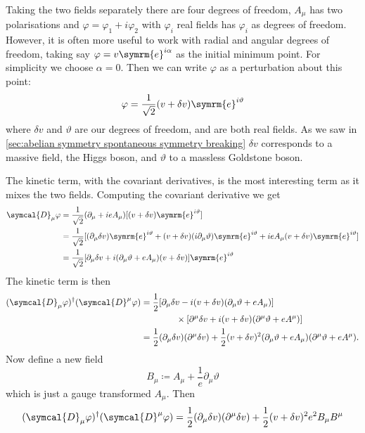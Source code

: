 \documentclass[fleqn]{NotesClass}
\newcommand{\e}{\symrm{e}}
\newcommand{\hermit}{\dagger}
\newcommand{\covariantDerivative}{\symcal{D}}
\begin{document}
    Taking the two fields separately there are four degrees of freedom, \(A_\mu\) has two polarisations and \(\varphi = \varphi_1 + i\varphi_2\) with \(\varphi_i\) real fields has \(\varphi_i\) as degrees of freedom.
    However, it is often more useful to work with radial and angular degrees of freedom, taking say \(\varphi = v\e^{i\alpha}\) as the initial minimum point.
    For simplicity we choose \(\alpha = 0\).
    Then we can write \(\varphi\) as a perturbation about this point:
    \begin{equation}
        \varphi = \frac{1}{\sqrt{2}}(v + \delta v)\e^{i\vartheta}
    \end{equation}
    where \(\delta v\) and \(\vartheta\) are our degrees of freedom, and are both real fields.
    As we saw in \cref{sec:abelian symmetry spontaneous symmetry breaking} \(\delta v\) corresponds to a massive field, the Higgs boson, and \(\vartheta\) to a massless Goldstone boson.
    
    The kinetic term, with the covariant derivatives, is the most interesting term as it mixes the two fields.
    Computing the covariant derivative we get
    \begin{align}
        \covariantDerivative_\mu \varphi &= \frac{1}{\sqrt{2}}(\partial_\mu + ieA_\mu) [(v + \delta v) \e^{i\vartheta}]\\
        &= \frac{1}{\sqrt{2}} [(\partial_\mu \delta v) \e^{i\vartheta} + (v + \delta v)(i\partial_\mu \vartheta)\e^{i\vartheta} + ieA_\mu (v + \delta v)\e^{i\vartheta}]\\
        &= \frac{1}{\sqrt{2}} [\partial_\mu \delta v + i(\partial_\mu \vartheta + eA_\mu)(v + \delta v)]\e^{i\vartheta}
    \end{align}
    The kinetic term is then
    \begin{align}
        (\covariantDerivative_\mu \varphi)^\hermit (\covariantDerivative^\mu \varphi) &= \frac{1}{2} [\partial_\mu \delta v - i(v + \delta v)(\partial_\mu \vartheta + eA_\mu)] \notag\\
        &\qquad \qquad \times [\partial^\mu \delta v + i(v + \delta v)(\partial^\mu \vartheta + eA^\mu)]\\
        &= \frac{1}{2}(\partial_\mu \delta v)(\partial^\mu \delta v) + \frac{1}{2}(v + \delta v)^2(\partial_\mu \vartheta + eA_\mu)(\partial^\mu \vartheta + eA^\mu).\notag
    \end{align}
    Now define a new field
    \begin{equation}
        B_\mu \coloneqq A_\mu + \frac{1}{e}\partial_\mu \vartheta
    \end{equation}
    which is just a gauge transformed \(A_\mu\).
    Then
    \begin{equation}
        (\covariantDerivative_\mu \varphi)^\hermit (\covariantDerivative^\mu \varphi) = \frac{1}{2}(\partial_\mu \delta v)(\partial^\mu \delta v) + \frac{1}{2}(v + \delta v)^2 e^2B_\mu B^\mu
    \end{equation}
    
\end{document}
